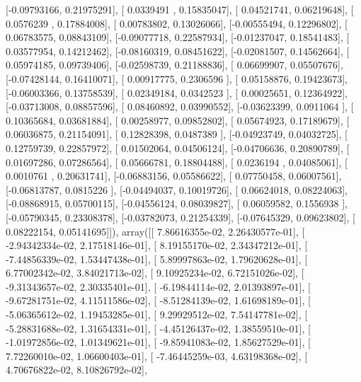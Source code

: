\documentclass{article}
\begin{document}
       [-0.09793166,  0.21975291],
       [ 0.0339491 ,  0.15835047],
       [ 0.04521741,  0.06219648],
       [ 0.0576239 ,  0.17884008],
       [ 0.00783802,  0.13026066],
       [-0.00555494,  0.12296802],
       [ 0.06783575,  0.08843109],
       [-0.09077718,  0.22587934],
       [-0.01237047,  0.18541483],
       [ 0.03577954,  0.14212462],
       [-0.08160319,  0.08451622],
       [-0.02081507,  0.14562664],
       [ 0.05974185,  0.09739406],
       [-0.02598739,  0.21188836],
       [ 0.06699907,  0.05507676],
       [-0.07428144,  0.16410071],
       [ 0.00917775,  0.2306596 ],
       [ 0.05158876,  0.19423673],
       [-0.06003366,  0.13758539],
       [ 0.02349184,  0.0342523 ],
       [ 0.00025651,  0.12364922],
       [-0.03713008,  0.08857596],
       [ 0.08460892,  0.03990552],
       [-0.03623399,  0.0911064 ],
       [ 0.10365684,  0.03681884],
       [ 0.00258977,  0.09852802],
       [ 0.05674923,  0.17189679],
       [ 0.06036875,  0.21154091],
       [ 0.12828398,  0.0487389 ],
       [-0.04923749,  0.04032725],
       [ 0.12759739,  0.22857972],
       [ 0.01502064,  0.04506124],
       [-0.04706636,  0.20890789],
       [ 0.01697286,  0.07286564],
       [ 0.05666781,  0.18804488],
       [ 0.0236194 ,  0.04085061],
       [ 0.0010761 ,  0.20631741],
       [-0.06883156,  0.05586622],
       [ 0.07750458,  0.06007561],
       [-0.06813787,  0.0815226 ],
       [-0.04494037,  0.10019726],
       [ 0.06624018,  0.08224063],
       [-0.08868915,  0.05700115],
       [-0.04556124,  0.08039827],
       [ 0.06059582,  0.1556938 ],
       [-0.05790345,  0.23308378],
       [-0.03782073,  0.21254339],
       [-0.07645329,  0.09623802],
       [ 0.08222154,  0.05141695]]), array([[  7.86616355e-02,   2.26430577e-01],
       [ -2.94342334e-02,   2.17518146e-01],
       [  8.19155170e-02,   2.34347212e-01],
       [ -7.44856339e-02,   1.53447438e-01],
       [  5.89997863e-02,   1.79620628e-01],
       [  6.77002342e-02,   3.84021713e-02],
       [  9.10925234e-02,   6.72151026e-02],
       [ -9.31343657e-02,   2.30335401e-01],
       [ -6.19844114e-02,   2.01393897e-01],
       [ -9.67281751e-02,   4.11511586e-02],
       [ -8.51284139e-02,   1.61698189e-01],
       [ -5.06365612e-02,   1.19453285e-01],
       [  9.29929512e-02,   7.54147781e-02],
       [ -5.28831688e-02,   1.31654331e-01],
       [ -4.45126437e-02,   1.38559510e-01],
       [ -1.01972856e-02,   1.01349621e-01],
       [ -9.85941083e-02,   1.85627529e-01],
       [  7.72260010e-02,   1.06600403e-01],
       [ -7.46445259e-03,   4.63198368e-02],
       [  4.70676822e-02,   8.10826792e-02],
\end{document}
